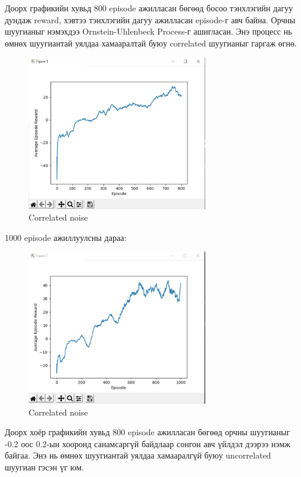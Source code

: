 \documentclass[12pt,A4]{report}
\begin{document}
Доорх графикийн хувьд 800 episode ажилласан бөгөөд босоо тэнхлэгийн дагуу дундаж reward, хэвтээ тэнхлэгийн дагуу ажилласан episode-г авч байна. Орчны шуугианыг нэмэхдээ Ornstein-Uhlenbeck Process-г ашигласан. Энэ процесс нь өмнөх шуугиантай уялдаа хамааралтай буюу correlated шуугианыг гаргаж өгнө. 

\begin{figure}[H]
\centering
\includegraphics[width=0.7\textwidth]{./images/after_800_ep}
\caption{Correlated noise}
\end{figure}

1000 episode ажиллуулсны дараа:

\begin{figure}[H]
\centering
\includegraphics[width=0.7\textwidth]{./images/after_1000_ep2}
\caption{Correlated noise}
\end{figure}

Доорх хоёр графикийн хувьд 800 episode ажилласан бөгөөд орчны шуугианыг -0.2 оос 0.2-ын хооронд санамсаргүй байдлаар сонгон авч үйлдэл дээрээ нэмж байгаа. Энэ нь өмнөх шуугиантай уялдаа хамааралгүй буюу uncorrelated шуугиан гэсэн үг юм. 
\end{document}
